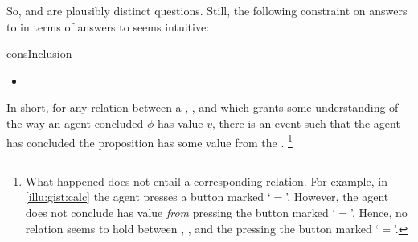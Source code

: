 \begin{note}
  So, \qWhy{} and \qHow{} are plausibly distinct questions.
  Still, the following constraint on answers to \qWhy{} in terms of answers to \qHow{} seems intuitive:

  \begin{constraint}{consInclusion}{\issueInclusion{}}
    \mbox{ }
    \vspace{-\baselineskip}
    \begin{itemize}
    \item
  \end{itemize}
  \vspace{-\baselineskip}
  \end{constraint}

  In short, for any relation between a , , and \pool{} which grants some understanding of the way an agent concluded \(\phi\) has value \(v\), there is an event such that the agent has concluded the proposition has some value from the \pool{}.%
  \footnote{
    What happened does not entail a corresponding relation.
  For example, in \autoref{illu:gist:calc} the agent presses a button marked `\(=\)'.
  However, the agent does not conclude \propM{\gistCalcEq{}} has value  \emph{from} pressing the button marked `\(=\)'.
  Hence, no relation seems to hold between \propM{\gistCalcEq{}}, , and the pressing the button marked `\(=\)'.
  }
\end{note}

